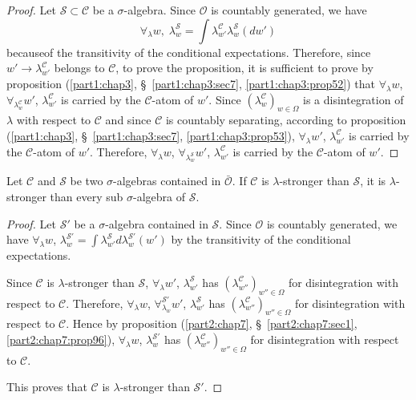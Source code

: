 \begin{proof}
Let $\mathscr{S} \subset \mathscr{C}$ be a $\sigma$-algebra. Since
$\mathscr{O}$ is countably generated, we have
$$ 
\forall_\lambda w, \; \lambda^\mathscr{S}_{w} = \int  \lambda^\mathscr{C}_{w'} \lambda^{\mathscr{S}}_w (dw')
$$
because\pageoriginale of the transitivity of the conditional
expectations. Therefore, since $w' \to \lambda^\mathscr{C}_{w'}$
belongs to $\mathscr{C}$, to prove the proposition, it is sufficient
to prove by proposition (\ref{part1:chap3},
\S\ \ref{part1:chap3:sec7}, \ref{part1:chap3:prop52}) that
$\forall_\lambda w$, 
$\forall_{\lambda^\mathscr{C}_w} w'$, $\lambda^\mathscr{C}_{w'}$ is
carried by the $\mathscr{C}$-atom of $w'$. Since
$(\lambda^\mathscr{C}_w)_{w \in \Omega}$ is a disintegration of
$\lambda$ with respect to $\mathscr{C}$ and since $\mathscr{C}$ is
countably separating, according to proposition (\ref{part1:chap3},
\S\ \ref{part1:chap3:sec7}, \ref{part1:chap3:prop53}),
$\forall_\lambda w'$, $\lambda^\mathscr{C}_{w'}$ is carried by the
$\mathscr{C}$-atom of $w'$. Therefore, $\forall_\lambda w$,
$\forall_{\lambda^\mathscr{S}_{w}} w'$, $\lambda^\mathscr{C}_{w'}$ is
carried by the $\mathscr{C}$-atom of $w'$. 
\end{proof}

\begin{proposition}\label{part2:chap7:prop100}
Let  $\mathscr{C}$ and $\mathscr{S}$ be two $\sigma$-algebras
contained in $\bar{\mathscr{O}}$. If $\mathscr{C}$ is
$\lambda$-stronger than $\mathscr{S}$, it is $\lambda$-stronger than
every sub $\sigma$-algebra of $\mathscr{S}$.
\end{proposition}

\begin{proof}
Let $\mathscr{S}'$ be a $\sigma$-algebra contained in
$\mathscr{S}$. Since $\mathscr{O}$ is countably generated, we have
$\forall_\lambda w$, $\lambda^{\mathscr{S}'}_w = \int
\lambda^\mathscr{S}_{w'}d\lambda^{\mathscr{S}'}_w(w')$   by the
transitivity of the conditional expectations.

Since $\mathscr{C}$ is $\lambda$-stronger than $\mathscr{S}$,
$\forall_\lambda w'$, $\lambda^\mathscr{S}_{w'}$ has
$(\lambda^\mathscr{C}_{w''})_{w'' \in \Omega}$ for disintegration with
respect to $\mathscr{C}$. Therefore, $\forall_\lambda w$,
$\forall_{\lambda_w}^{\mathscr{S}'} w'$, $\lambda^\mathscr{S}_{w'}$
has $(\lambda^\mathscr{C}_{w''})_{w'' \in \Omega}$ for disintegration
with respect to $\mathscr{C}$. Hence by proposition
(\ref{part2:chap7}, \S\ \ref{part2:chap7:sec1}, \ref{part2:chap7:prop96}), 
$\forall_\lambda w$, $\lambda^{\mathscr{S}'}_w$ has
$(\lambda^\mathscr{C}_{w''})_{w'' \in \Omega}$ for disintegration with
respect to $\mathscr{C}$. 

This proves that $\mathscr{C}$ is $\lambda$-stronger than
$\mathscr{S}'$. 
\end{proof}

